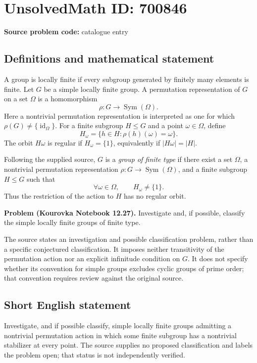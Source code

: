 \documentclass[11pt]{article}
\begin{document}
\section*{UnsolvedMath ID: 700846}
\textbf{Source problem code:} catalogue entry
\subsection{Definitions and mathematical statement}
A group is locally finite if every subgroup generated by finitely many elements is finite. Let \(G\) be a simple locally finite group. A permutation representation of \(G\) on a set \(\Omega\) is a homomorphism
\[
\rho:G\longrightarrow\operatorname{Sym}(\Omega).
\]
Here a nontrivial permutation representation is interpreted as one for which \(\rho(G)\ne\{\operatorname{id}_{\Omega}\}\). For a finite subgroup \(H\le G\) and a point \(\omega\in\Omega\), define
\[
H_{\omega}=\{h\in H:\rho(h)(\omega)=\omega\}.
\]
The orbit \(H\omega\) is regular if \(H_{\omega}=\{1\}\), equivalently if \(|H\omega|=|H|\).

Following the supplied source, \(G\) is a \emph{group of finite type} if there exist a set \(\Omega\), a nontrivial permutation representation \(\rho:G\to\operatorname{Sym}(\Omega)\), and a finite subgroup \(H\le G\) such that
\[
\forall\omega\in\Omega,\qquad H_{\omega}\ne\{1\}.
\]
Thus the restriction of the action to \(H\) has no regular orbit.

\textbf{Problem (Kourovka Notebook 12.27).} Investigate and, if possible, classify the simple locally finite groups of finite type.

The source states an investigation and possible classification problem, rather than a specific conjectured classification. It imposes neither transitivity of the permutation action nor an explicit infinitude condition on \(G\). It does not specify whether its convention for simple groups excludes cyclic groups of prime order; that convention requires review against the original source.
\subsection{Short English statement}
Investigate, and if possible classify, simple locally finite groups admitting a nontrivial permutation action in which some finite subgroup has a nontrivial stabilizer at every point. The source supplies no proposed classification and labels the problem open; that status is not independently verified.
\end{document}
